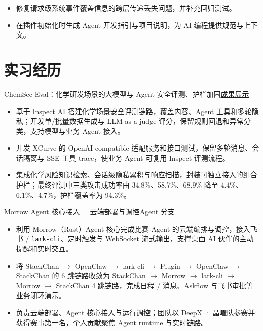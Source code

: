 \documentclass{resume}
\newcommand{\metainfo}[1]{{\fontsize{9.6}{13.7}\selectfont\color{muted}#1\par}\vspace{1.5pt}}
\newcommand{\projectlink}[2]{\href{#1}{\textcolor{muted}{#2}}}
\newcommand{\cvsection}[2]{\section{\texorpdfstring{\makebox[1.35em][l]{\normalfont #1}}{}#2}}
\begin{document}
\begin{itemize}
  \item 修复请求级系统事件覆盖信息的跨层传递丢失问题，并补充回归测试。
  \item 在插件初始化时生成 Agent 开发指引与项目说明，为 AI 编程提供规范与上下文。
\end{itemize}

\cvsection{\faBriefcase}{实习经历}
\metainfo{ChemSec-Eval：化学研发场景的大模型与 Agent 安全评测、护栏加固\quad\projectlink{https://1371149.github.io/jingtai.github.io/}{成果展示}}
\begin{itemize}
  \item 基于 Inspect AI 搭建化学场景安全评测链路，覆盖内容、Agent 工具和多轮隐私；开发单/批量数据生成与 LLM-as-a-judge 评分，保留规则回退和异常分类，支持模型与业务 Agent 接入。
  \item 开发 XCurve 的 OpenAI-compatible 适配服务和接口测试，保留多轮消息、会话隔离与 SSE 工具 trace，使业务 Agent 可复用 Inspect 评测流程。
  \item 集成化学风险知识检索、会话级隐私累积与响应扫描，封装可独立接入的组合护栏；最终评测中三类攻击成功率由 \mbox{34.8\%、58.7\%、68.9\%} 降至 \mbox{4.4\%、6.1\%、4.7\%}，护栏覆盖率为 94.3\%。
\end{itemize}

\metainfo{Morrow Agent 核心接入 · 云端部署与调控\quad\projectlink{https://github.com/catDforD/Morrow/tree/feat/robot-agent}{Agent 分支}}
\begin{itemize}
  \item 利用 Morrow（Rust）Agent 核心完成比赛 Agent 的云端编排与调控，接入飞书 / \texttt{lark-cli}、定时触发与 WebSocket 流式输出，支撑桌面 AI 伙伴的主动提醒和实时交互。
  \item 将 StackChan $\rightarrow$ OpenClaw $\rightarrow$ lark-cli $\rightarrow$ Plugin $\rightarrow$ OpenClaw $\rightarrow$ StackChan 的 6 跳链路收敛为 StackChan $\rightarrow$ Morrow $\rightarrow$ lark-cli $\rightarrow$ Morrow $\rightarrow$ StackChan 4 跳链路，完成日程 / 消息、Askflow 与飞书审批等业务闭环演示。
  \item 负责云端部署、Agent 核心接入与运行调控；团队以 DeepX · 晶曜队参赛并获得赛事第一名，个人贡献聚焦 Agent runtime 与实时链路。
\end{itemize}
\end{document}
